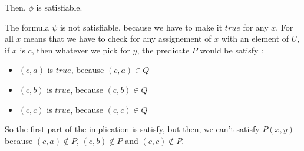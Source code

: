 \documentclass[a4paper,11pt]{report}
\begin{document}
Then, $\phi$ is satisfiable.

The formula $\psi$ is not satisfiable, because we have to make it $true$ for any
$x$. For all $x$ means that we have to check for any assignement of $x$ with an
element of $U$, if $x$ is $c$, then whatever we pick for $y$, the predicate $P$
would be satisfy :

\begin{itemize}
\item $(c,a)$ is $true$, because $(c,a) \in Q$
\item $(c,b)$ is $true$, because $(c,b) \in Q$
\item $(c,c)$ is $true$, because $(c,c) \in Q$
\end{itemize}

So the first part of the implication is satisfy, but then, we can't satisfy
$P(x,y)$ because $(c,a) \not\in P$, $(c,b) \not\in P$ and $(c,c) \not\in P$.
\end{document}
